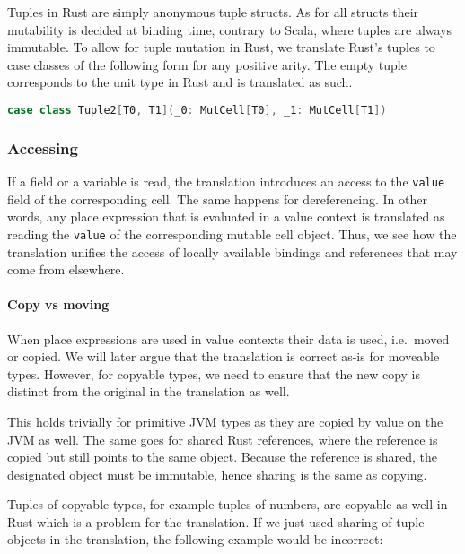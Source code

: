 Tuples in Rust are simply anonymous tuple structs. As for all structs their
mutability is decided at binding time, contrary to Scala, where tuples are
always immutable. To allow for tuple mutation in Rust, we translate Rust's
tuples to case classes of the following form for any positive arity. The empty
tuple corresponds to the unit type in Rust and is translated as such.

\begin{lstlisting}[language=Scala, style=short]
case class Tuple2[T0, T1](_0: MutCell[T0], _1: MutCell[T1])
\end{lstlisting}

\subsubsection{Accessing}

If a field or a variable is read, the translation introduces an access
to the \passthrough{\lstinline!value!} field of the corresponding cell.
The same happens for dereferencing. In other words, any place expression
that is evaluated in a value context is translated as reading the
\passthrough{\lstinline!value!} of the corresponding mutable cell
object. Thus, we see how the translation unifies the access of locally
available bindings and references that may come from elsewhere.

\paragraph{Copy vs moving}

When place expressions are used in value contexts their data is used, i.e.~moved
or copied. We will later argue that the translation is correct as-is for
moveable types. However, for copyable types, we need to ensure that the new copy
is distinct from the original in the translation as well.

This holds trivially for primitive JVM types as they are copied by value
on the JVM as well. The same goes for shared Rust references, where the
reference is copied but still points to the same object. Because the
reference is shared, the designated object must be immutable, hence
sharing is the same as copying.

Tuples of copyable types, for example tuples of numbers, are copyable as
well in Rust which is a problem for the translation. If we just used
sharing of tuple objects in the translation, the following example would
be incorrect:

